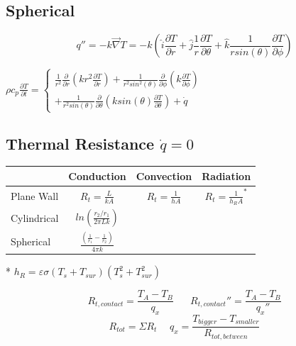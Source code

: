 \documentclass[twocolumn, 12pt]{article}
\begin{document}
\subsection*{Spherical}
    \begin{equation*}
        q'' = -k\Vec{\nabla} T = -k\left( \hat{i} \frac{\partial T}{\partial r} + \hat{j} \frac{1}{r}\frac{\partial T}{\partial \theta} + \hat{k} \frac{1}{rsin(\theta)} \frac{\partial T}{\partial \phi}\right)
    \end{equation*}
    \begin{center}
    \(
        \rho c_p \frac{\partial T}{\partial t} = 
        \begin{cases}
                        \frac{1}{r^2} \frac{ \partial }{\partial r}\left( kr^2 \frac{\partial T}{\partial r} \right) + \frac{1}{r^2sin^2(\theta)} \frac{\partial }{\partial \phi }\left(k\frac{\partial T}{\partial \phi} \right) \\
                        + \frac{1}{r^2 sin(\theta)} \frac{\partial }{\partial \theta}\left(ksin(\theta)\frac{\partial T}{\partial \theta} \right) + \dot{q}
        \end{cases}
    \)
    \end{center}

    

\subsection*{Thermal Resistance \(\dot{q}=0\)}
{\renewcommand{\arraystretch}{2}
\begin{tabular}{l|c|c|c}
                & Conduction & Convection & Radiation \\
     \hline
     Plane Wall & \(R_t = \frac{L}{kA}\) & \(R_t=\frac{1}{hA}\) & \(R_t =\frac{1}{h_RA}^*\)\\
     \hline
     Cylindrical & \(ln\left(\frac{r_2/r_1}{2\pi Lk}\right)\) & &\\
     \hline
     Spherical &  \(\frac{\left(\frac{1}{r_1}-\frac{1}{r_2} \right)}{4\pi k}\) & &
\end{tabular} \quad}
\begin{center}
    * \(h_R = \varepsilon \sigma (T_s+T_{sur})(T_s^2+T_{sur}^2)\)
\end{center}
\begin{equation*}
    R_{t,contact} = \frac{T_A-T_B}{q_x} \hspace{20pt} R_{t,contact}'' = \frac{T_A-T_B}{q_x''}
\end{equation*}
\begin{equation*}
    R_{tot} = \Sigma R_t \hspace{15pt} q_x = \frac{T_{bigger}-T_{smaller}}{R_{tot,between}}
\end{equation*}
\end{document}

